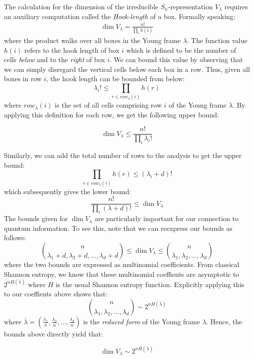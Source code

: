 \documentclass[11pt]{article}%
\begin{document}
\noindent The calculation for the dimension of the irreducible $S_n$-representation $V_\lambda$ requires an auxiliary computation called the \textit{Hook-length} of a box. Formally speaking:
\begin{gather*}
  \dim V_\lambda = \frac{n!}{\prod_{i} h(i)}
\end{gather*}
where the product walks over all boxes in the Young frame $\lambda$. The function value $h(i)$ refers to the hook length of box $i$ which is defined to be the number of cells \textit{below} and to the \textit{right} of box $i$. We can bound this value by observing that we can simply disregard the vertical cells below each box in a row. Thus, given all boxes in row $i$, the hook length can be bounded from below:
$$ \lambda_i! \leq \prod_{r \in row_\lambda(i)} h(r) $$ where $row_\lambda(i)$ is the set of all cells comprising row $i$ of the Young frame $\lambda$. By applying this definition for each row, we get the following upper bound:

\begin{equation}\label{vbound}
  \dim V_\lambda \leq \frac{n!}{\prod_i \lambda_i!}
\end{equation}

\noindent Similarly, we can add the total number of rows to the analysis to get the upper bound:
$$\prod_{r \in row_\lambda(i)} h(r) \leq (\lambda_i + d)!$$ which subsequently gives the lower bound:
$$ \frac{n!}{\prod_i (\lambda +d)!} \leq \dim V_{\lambda} $$
The bounds given for $\dim V_\lambda$ are particularly important for our connection to quantum information. To see this, note that we can reexpress our bounds as follows:
$${n \choose \lambda_1+d,\lambda_2+d,...,\lambda_d+d} \leq \dim V_{\lambda} \leq {n \choose \lambda_1,\lambda_2,...,\lambda_d} $$ where the two bounds are expressed as multinomial coefficients. From classical Shannon entropy, we know that these multinomial coeffients are asymptotic to $2^{nH(\bar{\lambda})}$ where $H$ is the usual Shannon entropy function. Explicitly applying this to our coeffients above shows that:
$$ {n \choose \lambda_1,\lambda_2,...,\lambda_d} \sim 2^{nH(\bar{\lambda})}$$
where $\bar{\lambda} = (\frac{\lambda_1}{n}, \frac{\lambda_2}{n},...,\frac{\lambda_d}{n})$ is the \textit{reduced form} of the Young frame $\lambda$. Hence, the bounds above directly yield that:

\begin{equation} \label{asymp}
  \dim V_{\lambda} \sim 2^{nH(\bar{\lambda})}
\end{equation}
\end{document}
